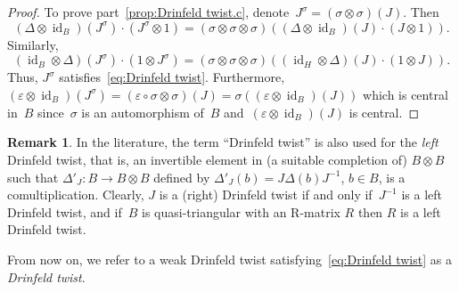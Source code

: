 \documentclass[12pt, reqno]{amsart}
\theoremstyle{definition}
\newtheorem{remark}[theorem]{Remark}
\numberwithin{equation}{section}
\newcommand{\tensor}{\otimes}
\DeclareMathOperator{\id}{id}
\begin{document}
\begin{proof}
To prove part~\ref{prop:Drinfeld twist.c}, denote~$J^\sigma=(\sigma\tensor\sigma)(J)$. Then
$$
(\Delta\tensor\id_B)(J^\sigma)
\cdot(J^\sigma\tensor 1)
=(\sigma\tensor\sigma\tensor\sigma)(
(\Delta\tensor \id_B)(J)\cdot (J\tensor 1)).
$$
Similarly, 
$$
(\id_B\tensor\Delta)(J^\sigma)\cdot(1\tensor J^\sigma)
=(\sigma\tensor\sigma\tensor\sigma)((\id_H\tensor\Delta)(J)\cdot(1\tensor J)).
$$
Thus, $J^{\sigma}$ satisfies~\eqref{eq:Drinfeld twist}. 
Furthermore, $(\varepsilon\tensor\id_B)(J^\sigma)=(\varepsilon\circ\sigma\tensor \sigma)(J)=\sigma((\varepsilon\tensor\id_B)(J))$ which is central in~$B$ since~$\sigma $ is an automorphism of~$B$ and~$(\varepsilon\tensor\id_B)(J)$ is central. 
\end{proof}

\begin{remark}\label{rem:left twist}
In the literature, the term ``Drinfeld twist'' is also used for the {\em left} Drinfeld twist, that is, an invertible element in (a suitable completion of) $B\tensor B$ such that $\Delta'_J:B\to B\tensor B$ defined by
$\Delta'_J(b)=J \Delta(b) J^{-1}$, $b\in B$, is a comultiplication. 
Clearly, $J$ is a (right) Drinfeld twist if and only if~$J^{-1}$
is a left Drinfeld twist, and if~$B$ is quasi-triangular
with an R-matrix $R$ then $R$ is a left Drinfeld twist.
\end{remark}
From now on, we refer to a weak Drinfeld twist satisfying~\eqref{eq:Drinfeld twist} as a {\em Drinfeld twist}. 
\end{document}
